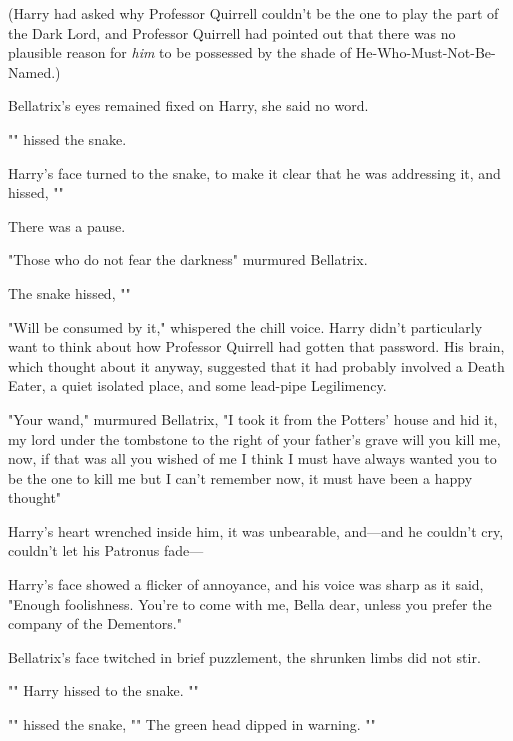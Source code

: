 (Harry had asked why Professor Quirrell couldn't be the one to play the part of
the Dark Lord, and Professor Quirrell had pointed out that there was no
plausible reason for \emph{him} to be possessed by the shade of
He-Who-Must-Not-Be-Named.)

Bellatrix's eyes remained fixed on Harry, she said no word.

"" hissed the snake.

Harry's face turned to the snake, to make it clear that he was addressing it,
and hissed, ""

There was a pause.

"Those who do not fear the darkness{\el}" murmured Bellatrix.

The snake hissed, ""

"Will be consumed by it," whispered the chill voice. Harry didn't particularly
want to think about how Professor Quirrell had gotten that password. His brain,
which thought about it anyway, suggested that it had probably involved a Death
Eater, a quiet isolated place, and some lead-pipe Legilimency.

"Your wand," murmured Bellatrix, "I took it from the Potters' house and hid it,
my lord{\el} under the tombstone to the right of your father's grave{\el}
will you kill me, now, if that was all you wished of me{\el} I think I must
have always wanted you to be the one to kill me{\el} but I can't remember
now, it must have been a happy thought{\el}"

Harry's heart wrenched inside him, it was unbearable, and—and he couldn't
cry, couldn't let his Patronus fade—

Harry's face showed a flicker of annoyance, and his voice was sharp as it said,
"Enough foolishness. You're to come with me, Bella dear, unless you prefer the
company of the Dementors."

Bellatrix's face twitched in brief puzzlement, the shrunken limbs did not stir.

"" Harry hissed to the snake. ""

"" hissed the snake, "" The green head dipped in warning.
""

